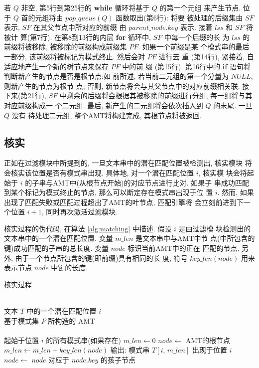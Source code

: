 \documentclass{ws-ijprai}
\begin{document}
若 $Q$ 非空, 第5行到第25行的 \textbf{while} 循环将基于 $Q$ 的第一个元组
来产生节点. 位于 $Q$ 首的元组将由 $pop\_queue(Q)$ 函数取出(第6行): 将要
被处理的后缀集由 $SF$ 表示, $SF$ 在其父节点中所对应的前缀
由 $parent\_node.key$ 表示. 接着 $lss$ 和 $SF$ 将被计
算(第7行). 在第8到13行的内层 \textbf{for} 循环中, $SF$ 中每一个后缀的长
为 $lss$ 的前缀将被移除, 被移除的前缀构成前缀集 $PF$. 如果一个前缀是某
个模式串的最后一部分, 该前缀将被标记为模式终止. 然后会对 $PF$ 进行去
重 (第14行), 紧接着, 自适应地产生一个新的树节点来保存 $PF$ 中的前
缀 (第15行). 第16行中的 \textbf{if} 语句将判断新产生的节点是否是根节点:如
前所述, 若当前二元组的第一个分量为 $NULL$, 则新产生的节点为根节
点; 否则, 新节点将会与其父节点中的对应前缀相关联. 接下来(第21行), $SF$
中剩余的后缀将会根据其被移除的前缀进行分组, 每一组将与其对应前缀构成一
个二元组. 最后, 新产生的二元组将会依次插入到 $Q$ 的末尾. 一旦 $Q$ 没有
待处理二元组, 整个AMT将构建完成, 其根节点将被返回.

\subsection{核实}
\label{subsec:matching}

正如在过滤模块中所提到的, 一旦文本串中的潜在匹配位置被检测出, 核实模块
将会核实该位置是否有模式串出现. 具体地, 对一个潜在匹配位置 $i$, 核实模
块会将起始于 $i$ 的子串与AMT中(从根节点开始)的对应节点进行比对. 如果子
串成功匹配到某个标记为模式终止的节点, 那么可以断定存在模式串出现于位
置 $i$. 然而, 如果出现了匹配失败或匹配过程超出了AMT的叶节点, 匹配引擎将
会立刻前进到下一个位置 $i+1$, 同时再次激活过滤模块.

核实过程的伪代码, 在算法 \ref{alg:matching} 中描述. 假设 $i$ 是由过滤模
块检测出的文本串中的一个潜在匹配位置. 变量 $m\_len$ 是文本串中与AMT中节
点(中所包含的键)成功匹配的子串的总长度. 变量 $node$ 标识当前AMT中的正在
匹配的节点. 另外, 由于一个节点所包含的键(即前缀)具有相同的长
度, 符号 $key\_len(node)$ 用来表示节点 $node$ 中键的长度.

\begin{algorithm}
  \caption{核实过程}\scriptsize
  \label{alg:matching}
  \begin{algorithmic}[1]
    \REQUIRE ~~\\
    文本 $T$ 中的一个潜在匹配位置 $i$ \\
    基于模式集 $P$ 所构造的 AMT\\
    \ENSURE ~~\\
    起始于位置 $i$ 的所有模式串(如果存在)
    \STATE
    \STATE $m\_len \leftarrow 0$
    \STATE $node \leftarrow $ AMT的根节点
    \STATE
    \STATE $m\_len \leftarrow m\_len + key\_len(node)$
    \STATE 输出: 模式串 $T[i,\,m\_len]$ 出现于位置 $i$
    \ENDIF
    \STATE $node \leftarrow$  $node$ 对应于 $node.key$ 的孩子节点
    \ENDWHILE
  \end{algorithmic}
\end{algorithm}
\end{document}
